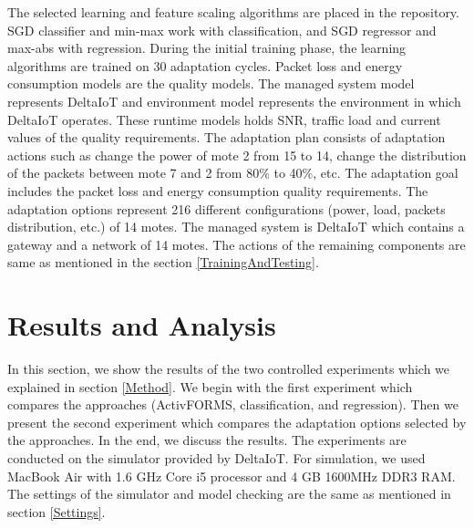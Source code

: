 \documentclass[a4paper,12pt]{article}
\begin{document}
The selected learning and feature scaling algorithms are placed in the repository. SGD classifier and min-max work with classification, and SGD regressor and max-abs with regression. During the initial training phase, the learning algorithms are trained on 30 adaptation cycles. Packet loss and energy consumption models are the quality models. The managed system model represents DeltaIoT and environment model represents the environment in which DeltaIoT operates. These runtime models holds SNR, traffic load and current values of the quality requirements. The adaptation plan consists of adaptation actions such as change the power of mote 2 from 15 to 14, change the distribution of the packets between mote 7 and 2 from 80\% to 40\%, etc. The adaptation goal includes the packet loss and energy consumption quality requirements. The adaptation options represent 216 different configurations (power, load, packets distribution, etc.) of 14 motes. The managed system is DeltaIoT which contains a gateway and a network of 14 motes. The actions of the remaining components are same as mentioned in the section \ref{TrainingAndTesting}.
\newpage
\section{Results and Analysis} \label{ResultsAndAnalysis}
In this section, we show the results of the two controlled experiments which we explained in section \ref{Method}. We begin with the first experiment which compares the approaches (ActivFORMS, classification, and regression). Then we present the second experiment which compares the adaptation options selected by the approaches. In the end, we discuss the results. The experiments are conducted on the simulator provided by DeltaIoT. For simulation, we used MacBook Air with 1.6 GHz Core i5 processor and 4 GB 1600MHz DDR3 RAM. The settings of the simulator and model checking are the same as mentioned in section \ref{Settings}. 
\end{document}
